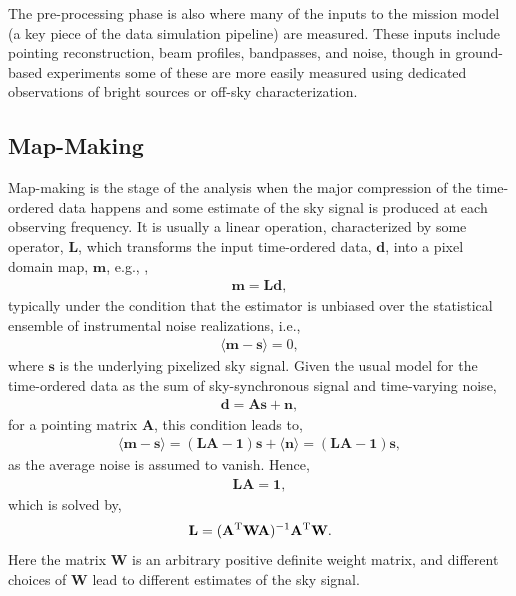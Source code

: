 The pre-processing phase is also where many of the inputs to the mission model (a key piece of the
data simulation pipeline) are measured. These inputs include pointing reconstruction, beam profiles, 
bandpasses, and noise, though in ground-based experiments some of these are more easily
measured using dedicated observations of bright sources or off-sky characterization.


\subsection{Map-Making}
\label{sec_mapmaking}

Map-making is the stage of the analysis when the major compression of the time-ordered data happens and some estimate of the sky signal is produced at each observing frequency. It is usually a linear operation, characterized by some operator, $\mathbf{L}$, which transforms the input time-ordered data, $\mathbf{d}$, into a pixel domain map, $\mathbf{m}$, 
e.g., \cite{Tegmark1997},
\begin{eqnarray}
\mathbf{m} = \mathbf{L}\mathbf{d},
\end{eqnarray}
typically under the condition that the estimator is unbiased over the statistical ensemble of instrumental noise realizations, i.e.,
\begin{eqnarray}
\langle \mathbf{m} - \mathbf{s}\rangle = 0,
\label{eq:condMaps}
\end{eqnarray}
where $\mathbf{s}$ is the underlying pixelized sky signal. Given the usual model for the time-ordered data as the sum of sky-synchronous signal and time-varying noise, 
\begin{eqnarray}
\mathbf{d} = \mathbf{A}\mathbf{s} + \mathbf{n},
\end{eqnarray}
for a pointing matrix $\mathbf{A}$, this condition leads to,
\begin{eqnarray}
\langle \mathbf{m} - \mathbf{s}\rangle =  (\mathbf{L}\mathbf{A}-\mathbf{1})\mathbf{s} 
+ \langle \mathbf{n} \rangle = (\mathbf{L}\mathbf{A}-\mathbf{1})\mathbf{s},
\end{eqnarray}
as the average noise is assumed to vanish. Hence,
\begin{eqnarray}
\mathbf{L}\mathbf{A} = \mathbf{1},
\end{eqnarray}
which is solved by,
\begin{eqnarray}
\mathbf{L} = (\mathbf{A}^{\rm T} \mathbf{W} \mathbf{A})^{-1} \mathbf{A}^{\rm T} \mathbf{W}.
\end{eqnarray}
Here the matrix $\mathbf{W}$ is an arbitrary positive definite weight matrix, and different choices of $\mathbf{W}$ lead to different estimates of the sky signal.
